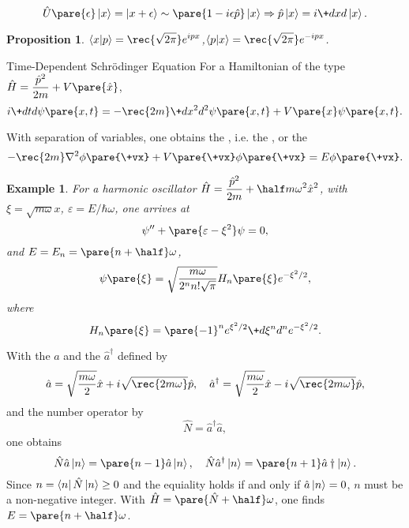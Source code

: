 \documentclass[hidelinks]{article}
\newtheorem{example}{Example}
\newtheorem{proposition}{Proposition}
\begin{document}
\[ \hat{U}\pare{\epsilon}\ket{x} = \ket{x+\epsilon} \sim \pare{1-i\epsilon \hat{p}}\ket{x} \Rightarrow \hat{p}\ket{x} = i\+dxd{}\ket{x}. \]
\begin{proposition}
    $\displaystyle \braket{x}{p} = \rec{\sqrt{2\pi}}e^{ipx}$,\quad $\displaystyle \braket{p}{x} = \rec{\sqrt{2\pi}}e^{-ipx}$.
\end{proposition}
\begin{finaleq}{Time-Dependent Schr\"odinger Equation}
    For a Hamiltonian of the type $\displaystyle \hat H = \frac{\hat p^2}{2m} + V\pare{\hat{x}}$,
    \[ i\+dtd{}\psi\pare{x,t} = -\rec{2m}\+d{x^2}d{^2}\psi\pare{x,t}+V\pare{x}\psi\pare{x,t}. \]
\end{finaleq}
With separation of variables, one obtains the , i.e. the , or the 
\[ -\rec{2m}\laplacian \phi\pare{\+vx} + V\pare{\+vx}\phi\pare{\+vx} = E\phi\pare{\+vx}. \]
\begin{sample}
    \begin{example}
        For a harmonic oscillator $\displaystyle \hat H = \frac{\hat p^2}{2m} + \half m\omega^2 \hat{x}^2$, with $\xi = \sqrt{m\omega}x$, $\varepsilon = E/\hbar\omega$, one arrives at
        \[ \psi'' + \pare{\varepsilon - \xi^2}\psi = 0, \]
        and $\displaystyle E = E_n = \pare{n+\half}\omega$,
        \[ \psi\pare{\xi} = \sqrt{\frac{m\omega}{2^n n! \sqrt{\pi}}} H_n\pare{\xi}e^{-\xi^2/2}, \]
        where
        \[ H_n\pare{\xi} = \pare{-1}^n e^{\xi^2/2}\+d{\xi^n}d{^n}e^{-\xi^2/2}. \]
    \end{example}
\end{sample}
With the  $\hat a$ and the  $\hat a^\dagger$ defined by
\[ \hat a = \sqrt{\frac{m\omega}{2}}\hat x + i\sqrt{\rec{2m\omega}}\hat p,\quad \hat a^\dagger = \sqrt{\frac{m\omega}{2}}\hat x - i\sqrt{\rec{2m\omega}}\hat p, \]
and the number operator by
\[ \hat N = \hat a^\dagger \hat a, \]
one obtains
\[ \hat N\hat a\ket{n} = \pare{n-1}\hat a\ket{n},\quad \hat N\hat a^\dagger\ket{n} = \pare{n+1}\hat a\dagger\ket{n}. \]
Since $n = \bra{n}\hat N\ket{n} \ge 0$ and the equiality holds if and only if $\hat a\ket{n} = 0$, $n$ must be a non-negative integer. With $\displaystyle \hat H = \pare{\hat N+\half}\omega$, one finds $\displaystyle E = \pare{n+\half}\omega$.

\end{document}
